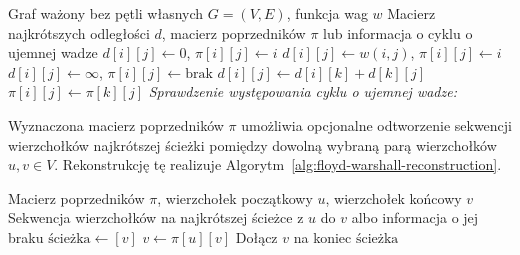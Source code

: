 \documentclass[11pt,a4paper,oneside]{report}
\begin{document}
\begin{algorithm}[H]
  \caption{Algorytm Floyda--Warshalla}
  \label{alg:floyd-warshall}
  \small
  \begin{algorithmic}[1]
    \Require Graf ważony bez pętli własnych $G=(V,E)$, funkcja wag $w$
    \Ensure Macierz najkrótszych odległości $d$, macierz poprzedników $\pi$ lub informacja o cyklu o ujemnej wadze
          \State $d[i][j] \gets 0$, $\pi[i][j] \gets i$
          \State $d[i][j] \gets w(i,j)$, $\pi[i][j] \gets i$
        \Else
          \State $d[i][j] \gets \infty$, $\pi[i][j] \gets \text{brak}$
        \EndIf
      \EndFor
    \EndFor
            \State $d[i][j] \gets d[i][k] + d[k][j]$
            \State $\pi[i][j] \gets \pi[k][j]$
          \EndIf
        \EndFor
      \EndFor
    \EndFor
    \Statex \textit{Sprawdzenie występowania cyklu o ujemnej wadze:}
        \State {}
      \EndIf
    \EndFor
    \State {}
  \end{algorithmic}
\end{algorithm}

Wyznaczona macierz poprzedników $\pi$ umożliwia opcjonalne odtworzenie sekwencji wierzchołków najkrótszej ścieżki pomiędzy dowolną wybraną parą wierzchołków $u, v \in V$. Rekonstrukcję tę realizuje Algorytm~\ref{alg:floyd-warshall-reconstruction}.

\begin{algorithm}[H]
  \caption{Odtwarzanie ścieżki na~podstawie macierzy poprzedników}
  \label{alg:floyd-warshall-reconstruction}
  \small
  \begin{algorithmic}[1]
    \Require Macierz poprzedników $\pi$, wierzchołek początkowy $u$, wierzchołek końcowy $v$
    \Ensure Sekwencja wierzchołków na najkrótszej ścieżce z $u$ do $v$ albo informacja o jej braku
      \State {}
    \EndIf
    \State $\text{ścieżka} \gets [v]$
      \State $v \gets \pi[u][v]$
      \State Dołącz $v$ na koniec $\text{ścieżka}$
    \EndWhile
    \State {}
  \end{algorithmic}
\end{algorithm}
\end{document}

